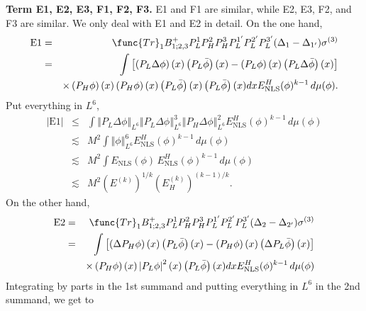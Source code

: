 \documentclass[12pt,letterpaper,leqno]{amsart}
\theoremstyle{plain}
\numberwithin{equation}{section}
\numberwithin{theorem}{section}
\numberwithin{proposition}{section}
\numberwithin{lemma}{section}
\numberwithin{corollary}{section}
\begin{document}
\textbf{Term E1, E2, E3, F1, F2, F3. }E1 and F1 are similar, while E2, E3,
F2, and F3 are similar. We only deal with E1 and E2 in detail. On the one
hand,%
\begin{eqnarray*}
\text{E1} &=&\func{Tr}_{1}B_{1;2,3}^{+}P_{L}^{1}P_{H}^{2}P_{H}^{3}P_{L}^{1^{%
\prime }}P_{L}^{2^{\prime }}P_{L}^{3^{\prime }}(\Delta _{1}-\Delta
_{1^{\prime }})\sigma ^{(3)} \\
&=&\int \left[ \left( P_{L}\Delta \phi \right) (x)\left( P_{L}\bar{\phi}%
\right) (x)-\left( P_{L}\phi \right) (x)\left( P_{L}\Delta \bar{\phi}\right)
(x)\right] \\
&&\times \left( P_{H}\phi \right) (x)\left( P_{H}\phi \right) (x)\left( P_{L}%
\bar{\phi}\right) (x)\left( P_{L}\bar{\phi}\right) (x)dxE_{\text{NLS}%
}^{H}(\phi )^{k-1}\,d\mu (\phi ).
\end{eqnarray*}%
Put everything in $L^{6}$,%
\begin{eqnarray*}
\left\vert \text{E1}\right\vert &\leqslant &\int \left\Vert P_{L}\Delta \phi
\right\Vert _{L^{6}}\left\Vert P_{L}\Delta \phi \right\Vert
_{L^{6}}^{3}\left\Vert P_{H}\Delta \phi \right\Vert _{L^{6}}^{2}E_{\text{NLS}%
}^{H}(\phi )^{k-1}\,d\mu (\phi ) \\
&\lesssim &M^{2}\int \left\Vert \phi \right\Vert _{L^{6}}^{6}E_{\text{NLS}%
}^{H}(\phi )^{k-1}\,d\mu (\phi ) \\
&\lesssim &M^{2}\int E_{\text{NLS}}(\phi )\,E_{\text{NLS}}^{H}(\phi
)^{k-1}\,d\mu (\phi ) \\
&\lesssim &M^{2}(E^{(k)})^{1/k}(E_{H}^{(k)})^{(k-1)/k}.
\end{eqnarray*}%
On the other hand,%
\begin{eqnarray*}
\text{E2} &=&\func{Tr}_{1}B_{1;2,3}^{+}P_{L}^{1}P_{H}^{2}P_{H}^{3}P_{L}^{1^{%
\prime }}P_{L}^{2^{\prime }}P_{L}^{3^{\prime }}(\Delta _{2}-\Delta
_{2^{\prime }})\sigma ^{(3)} \\
&=&\int \left[ \left( \Delta P_{H}\phi \right) (x)\left( P_{L}\bar{\phi}%
\right) (x)-\left( P_{H}\phi \right) (x)\left( \Delta P_{L}\bar{\phi}\right)
(x)\right] \\
&&\times \left( P_{H}\phi \right) (x)\left\vert P_{L}\phi \right\vert
^{2}(x)\left( P_{L}\bar{\phi}\right) (x)dxE_{\text{NLS}}^{H}(\phi
)^{k-1}\,d\mu (\phi )
\end{eqnarray*}%
Integrating by parts in the 1st summand and putting everything in $L^{6}$ in
the 2nd summand, we get to%
\end{document}
